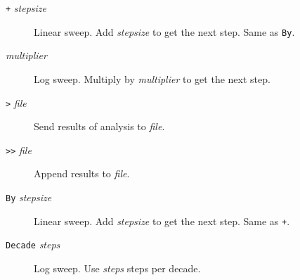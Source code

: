 \begin{description}

\item[{\tt +} {\it stepsize}] Linear sweep.  Add {\it
stepsize} to get the next step.  Same as {\tt By}.

\item[{\tt *} {\it multiplier}] Log sweep.  Multiply by
{\it multiplier} to get the next step.


\item[{\tt >} {\it file}] Send results of analysis to {\it file}.

\item[{\tt >>} {\it file}] Append results to {\it file}.



\item[{\tt By} {\it stepsize}] Linear sweep.  Add {\it
stepsize} to get the next step.  Same as {\tt +}.




\item[{\tt Decade} {\it steps}] Log sweep.  Use {\it
steps} steps per decade.






\end{description}
